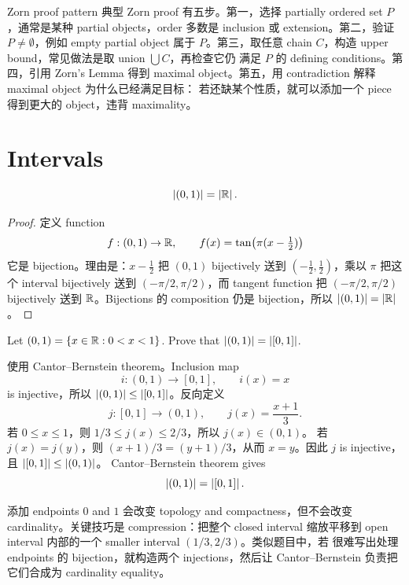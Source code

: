 \begin{reviewbox}{Zorn proof pattern}
典型 Zorn proof 有五步。第一，选择 partially ordered set \(P\)，通常是某种
partial objects，order 多数是 inclusion 或 extension。第二，验证
\(P\neq\emptyset\)，例如 empty partial object 属于 \(P\)。第三，取任意
chain \(C\)，构造 upper bound，常见做法是取 union \(\bigcup C\)，再检查它仍
满足 \(P\) 的 defining conditions。第四，引用 Zorn's Lemma 得到 maximal
object。第五，用 contradiction 解释 maximal object 为什么已经满足目标：
若还缺某个性质，就可以添加一个 piece 得到更大的 object，违背 maximality。
\end{reviewbox}

\section{Intervals}

\begin{theorem}
\[
  \left|(0,1)\right|=\left|\mathbb{R}\right|.
\]
\end{theorem}

\begin{proof}
定义 function
\[
  f:(0,1)\to\mathbb{R},\qquad
  f(x)=\tan\bigl(\pi(x-\tfrac12)\bigr)
\]
它是 bijection。理由是：\(x-\tfrac12\) 把 \((0,1)\) bijectively 送到
\((-\tfrac12,\tfrac12)\)，乘以 \(\pi\) 把这个 interval bijectively 送到
\((-\pi/2,\pi/2)\)，而 tangent function 把
\((-\pi/2,\pi/2)\) bijectively 送到 \(\mathbb{R}\)。Bijections 的 composition 仍是
bijection，所以 \(\left|(0,1)\right|=\left|\mathbb{R}\right|\)。
\end{proof}

\begin{exerciseblock}
Let \((0,1)=\{x\in\mathbb{R}:0<x<1\}\). Prove that
\(\left|(0,1)\right|=\left|[0,1]\right|\).
\end{exerciseblock}

\begin{solution}
使用 Cantor--Bernstein theorem。Inclusion map
\[
  i:(0,1)\to[0,1],\qquad i(x)=x
\]
is injective，所以 \(\left|(0,1)\right|\le\left|[0,1]\right|\)。反向定义
\[
  j:[0,1]\to(0,1),\qquad j(x)=\frac{x+1}{3}.
\]
若 \(0\le x\le 1\)，则 \(1/3\le j(x)\le 2/3\)，所以 \(j(x)\in(0,1)\)。
若 \(j(x)=j(y)\)，则 \((x+1)/3=(y+1)/3\)，从而 \(x=y\)。因此 \(j\) is
injective，且 \(\left|[0,1]\right|\le\left|(0,1)\right|\)。
Cantor--Bernstein theorem gives
\[
  \left|(0,1)\right|=\left|[0,1]\right|.
\]
\end{solution}

\begin{explanation}
添加 endpoints \(0\) and \(1\) 会改变 topology and compactness，但不会改变
cardinality。关键技巧是 compression：把整个 closed interval 缩放平移到
open interval 内部的一个 smaller interval \((1/3,2/3)\)。类似题目中，若
很难写出处理 endpoints 的 bijection，就构造两个 injections，然后让
Cantor--Bernstein 负责把它们合成为 cardinality equality。
\end{explanation}

